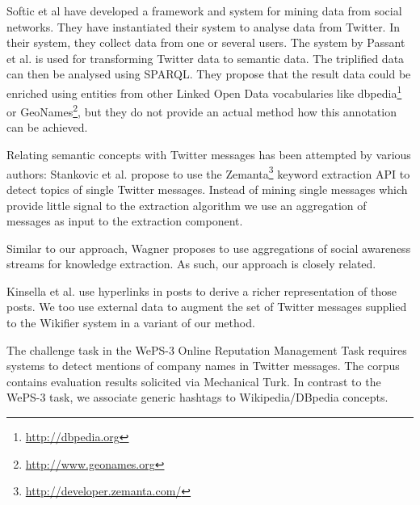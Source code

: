 \documentclass{llncs}
\begin{document}
Softic et al \cite{key:softic} have developed a framework and system for mining data from social networks. They have instantiated their system to analyse data from Twitter. In their system, they collect data from one or several users. The system by Passant et al. \cite{key:smob} is used for transforming Twitter data to semantic data. The triplified data can then be analysed using SPARQL. They propose that the result data could be enriched using entities from other Linked Open Data vocabularies like dbpedia\footnote{\url{http://dbpedia.org}} or GeoNames\footnote{\url{http://www.geonames.org}}, but they do not provide an actual method how this annotation can be achieved.

Relating semantic concepts with Twitter messages has been attempted by various authors:
Stankovic et al. \cite{key:stanko} propose to use the Zemanta\footnote{\url{http://developer.zemanta.com/}} keyword extraction API to detect topics of single Twitter messages. 
Instead of mining single messages which provide little signal to the extraction algorithm we use an aggregation of messages as input to the extraction component.

Similar to our approach, Wagner \cite{key:clauwa} proposes to use aggregations of social awareness streams for knowledge extraction. As such, our approach is closely related.

Kinsella et al. \cite{key:kinsella} use hyperlinks in posts to derive a richer representation of those posts. We too use external data to augment the set of Twitter messages supplied to the Wikifier system in a variant of our method.

The challenge task in the WePS-3 Online Reputation Management Task\cite{key:clef} requires systems to detect mentions of company names in Twitter messages.
The corpus contains evaluation results solicited via Mechanical Turk. In contrast to the WePS-3 task, we associate generic hashtags to Wikipedia/DBpedia concepts.
\end{document}
